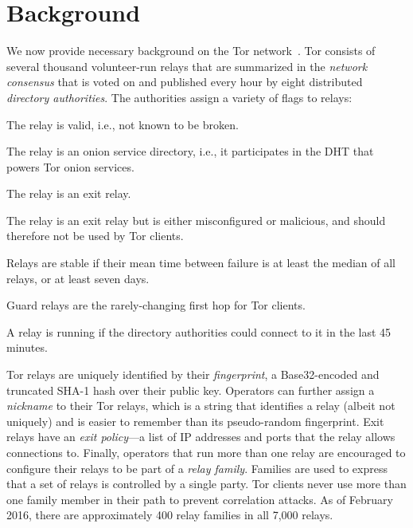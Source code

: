 \section{Background}
\label{sec:background}
We now provide necessary background on the Tor network~\cite{Dingledine2004a}.
Tor consists of several thousand volunteer-run relays that are summarized in the
\emph{network consensus} that is voted on and published every hour by eight
distributed \emph{directory authorities}.  The authorities assign a variety of
flags to relays:

\begin{description}[noitemsep]
	\item[Valid:] The relay is valid, i.e., not known to be broken.
	\item[HSDir:] The relay is an onion service directory, i.e., it participates
		in the DHT that powers Tor onion services.
	\item[Exit:] The relay is an exit relay.
	\item[BadExit:] The relay is an exit relay but is either misconfigured or
		malicious, and should therefore not be used by Tor clients.
	\item[Stable:] Relays are stable if their mean time between failure is at
		least the median of all relays, or at least seven days.
	\item[Guard:] Guard relays are the rarely-changing first hop for Tor clients.
	\item[Running:] A relay is running if the directory authorities could
		connect to it in the last 45 minutes.
\end{description}

Tor relays are uniquely identified by their \emph{fingerprint}, a Base32-encoded
and truncated SHA-1 hash over their public key.  Operators can further assign a
\emph{nickname} to their Tor relays, which is a string that identifies a relay
(albeit not uniquely) and is easier to remember than its pseudo-random
fingerprint.  Exit relays have an \emph{exit policy}---a list of IP addresses
and ports that the relay allows connections to.  Finally, operators that run
more than one relay are encouraged to configure their relays to be part of a
\emph{relay family}.  Families are used to express that a set of relays is
controlled by a single party.  Tor clients never use more than one family member
in their path to prevent correlation attacks.  As of February 2016, there are
approximately 400 relay families in all 7,000 relays.
